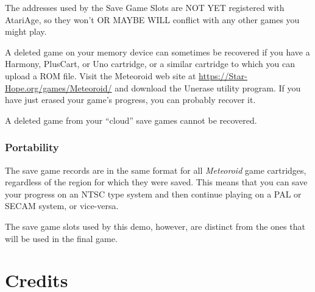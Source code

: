 \documentclass[10pt,twocolumn,openany,article]{memoir}
\begin{document}
The addresses  used by the Save  Game Slots are NOT  YET registered with
AtariAge, so they won't OR MAYBE  WILL conflict with any other games you
might play.

A deleted game  on your memory device can sometimes  be recovered if you
have a  Harmony, PlusCart, or Uno  cartridge, or a similar  cartridge to
which  you can  upload  a ROM  file.  Visit the  Meteoroid  web site  at
\href{https://Star-Hope.org/games/Meteoroid/}{https://Star-Hope\-.org/\-games/\-Meteoroid/}
and download the  Unerase utility program. If you have  just erased your
game's progress, you can probably recover it.

\ifdefined\PLUSCART
A deleted game from your ``cloud'' save games cannot be recovered.
\fi

\fi


\subsection{Portability}

The save game records are in the same format for all \textit{Meteoroid} game
cartridges, regardless of the region for which they were saved.  This means
that you can save your progress on an NTSC type system and then continue
playing on a PAL or SECAM system, or vice-versa.

\ifdefined\DEMO

The save  game slots used by  this demo, however, are  distinct from the
ones that will be used in the final game.

\fi

\chapter{Credits}
\end{document}
